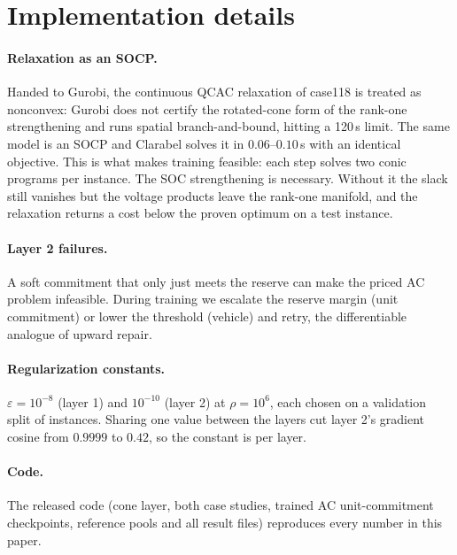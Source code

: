 \documentclass[10pt]{article}
\begin{document}



\appendix
\section{Implementation details}
\label{app:impl}
\paragraph{Relaxation as an SOCP.} Handed to Gurobi, the continuous QCAC relaxation of case118 is treated as nonconvex: Gurobi does not certify the rotated-cone form of the rank-one strengthening and runs spatial branch-and-bound, hitting a 120\,s limit. The same model is an SOCP and Clarabel solves it in $0.06$--$0.10$\,s with an identical objective. This is what makes training feasible: each step solves two conic programs per instance. The SOC strengthening is necessary. Without it the slack still vanishes but the voltage products leave the rank-one manifold, and the relaxation returns a cost below the proven optimum on a test instance.
\paragraph{Layer 2 failures.} A soft commitment that only just meets the reserve can make the priced AC problem infeasible. During training we escalate the reserve margin (unit commitment) or lower the threshold (vehicle) and retry, the differentiable analogue of upward repair.
\paragraph{Regularization constants.} $\varepsilon=10^{-8}$ (layer 1) and $10^{-10}$ (layer 2) at $\rho=10^6$, each chosen on a validation split of instances. Sharing one value between the layers cut layer 2's gradient cosine from $0.9999$ to $0.42$, so the constant is per layer.
\paragraph{Code.} The released code (cone layer, both case studies, trained AC unit-commitment checkpoints, reference pools and all result files) reproduces every number in this paper.
\end{document}
